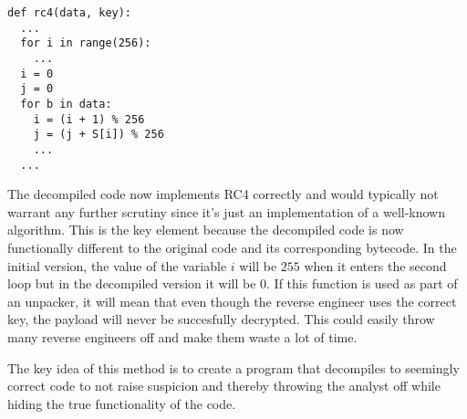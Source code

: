 \documentclass[twocolumn]{article}
\begin{document}
\begin{verbatim}
def rc4(data, key):
  ...
  for i in range(256):
    ...
  i = 0
  j = 0
  for b in data:
    i = (i + 1) % 256
    j = (j + S[i]) % 256
    ...
  ...
\end{verbatim}

The decompiled code now implements RC4 correctly and would typically not warrant any further scrutiny since it's just an implementation of a well-known algorithm. This is the key element because the decompiled code is now functionally different to the original code and its corresponding bytecode. In the initial version, the value of the variable $i$ will be $255$ when it enters the second loop but in the decompiled version it will be $0$. If this function is used as part of an unpacker, it will mean that even though the reverse engineer uses the correct key, the payload will never be succesfully decrypted. This could easily throw many reverse engineers off and make them waste a lot of time.

The key idea of this method is to create a program that decompiles to seemingly correct code to not raise suspicion and thereby throwing the analyst off while hiding the true functionality of the code.


\end{document}
